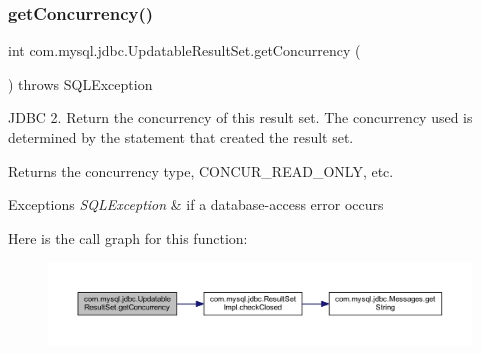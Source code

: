 \mbox{\label{classcom_1_1mysql_1_1jdbc_1_1_updatable_result_set_a6b38ea36a24339a9e7a0717217178d73}} 
\subsubsection{\texorpdfstring{get\+Concurrency()}{getConcurrency()}}
{\footnotesize\ttfamily int com.\+mysql.\+jdbc.\+Updatable\+Result\+Set.\+get\+Concurrency (\begin{DoxyParamCaption}{ }\end{DoxyParamCaption}) throws S\+Q\+L\+Exception}

J\+D\+BC 2. Return the concurrency of this result set. The concurrency used is determined by the statement that created the result set.

\begin{DoxyReturn}{Returns}
the concurrency type, C\+O\+N\+C\+U\+R\+\_\+\+R\+E\+A\+D\+\_\+\+O\+N\+LY, etc.
\end{DoxyReturn}

\begin{DoxyExceptions}{Exceptions}
{\em S\+Q\+L\+Exception} & if a database-\/access error occurs \\
\hline
\end{DoxyExceptions}
Here is the call graph for this function\+:
\nopagebreak
\begin{figure}[H]
\begin{center}
\leavevmode
\includegraphics[width=350pt]{classcom_1_1mysql_1_1jdbc_1_1_updatable_result_set_a6b38ea36a24339a9e7a0717217178d73_cgraph}
\end{center}
\end{figure}
\mbox{\label{classcom_1_1mysql_1_1jdbc_1_1_updatable_result_set_aef041f8d9d0778083716fc26652648fa}} 
